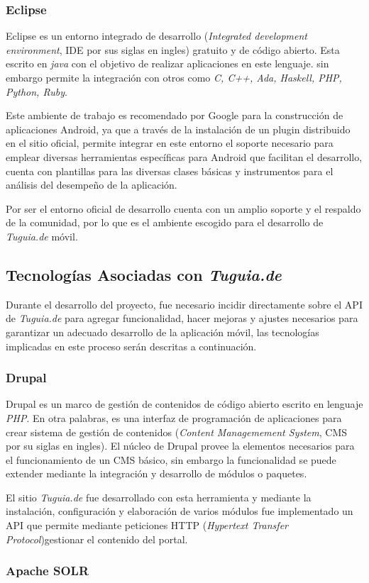 \subsubsection{Eclipse}

Eclipse es un entorno integrado de desarrollo (\textit{Integrated development environment}, IDE por sus siglas en ingles) gratuito y de código abierto. Esta escrito en \textit{java} con el objetivo de realizar aplicaciones en este lenguaje. sin embargo permite la integración con otros como \textit{C, C++, Ada, Haskell, PHP, Python, Ruby}.

Este ambiente de trabajo es recomendado por Google para la construcción de aplicaciones Android, ya que a través de la instalación de un plugin distribuido en el sitio oficial, permite integrar en este entorno el soporte necesario para emplear diversas herramientas específicas para Android que facilitan el desarrollo, cuenta con plantillas para las diversas clases básicas y instrumentos para el análisis del desempeño de la aplicación.

Por ser el entorno oficial de desarrollo cuenta con un amplio soporte y el respaldo de la comunidad, por lo que es el ambiente escogido para el desarrollo de \textit{Tuguia.de} móvil.

\subsection{Tecnologías Asociadas con \textit{Tuguia.de}} \label{subsect:Asociadas_movil}

Durante el desarrollo del proyecto, fue necesario incidir directamente sobre el API de \textit{Tuguia.de} para agregar funcionalidad, hacer mejoras y ajustes necesarios para garantizar un adecuado desarrollo de la aplicación móvil, las tecnologías implicadas en este proceso serán descritas a continuación.

\subsubsection{Drupal}

Drupal es un marco de gestión de contenidos de código abierto escrito en lenguaje \textit{PHP}. En otra palabras, es una interfaz de programación de aplicaciones para crear sistema de gestión de contenidos (\textit{Content Managemement System}, CMS por su siglas en ingles). El núcleo de Drupal provee la elementos necesarios para el funcionamiento de un CMS básico, sin embargo la funcionalidad se puede extender mediante la integración y desarrollo de módulos o paquetes\cite{TV10}.

El sitio \textit{Tuguia.de} fue desarrollado con esta herramienta y mediante la instalación, configuración y elaboración de varios módulos fue implementado un API que permite mediante peticiones HTTP (\textit{Hypertext Transfer Protocol})gestionar el contenido del portal.

\subsubsection{Apache SOLR}


   


